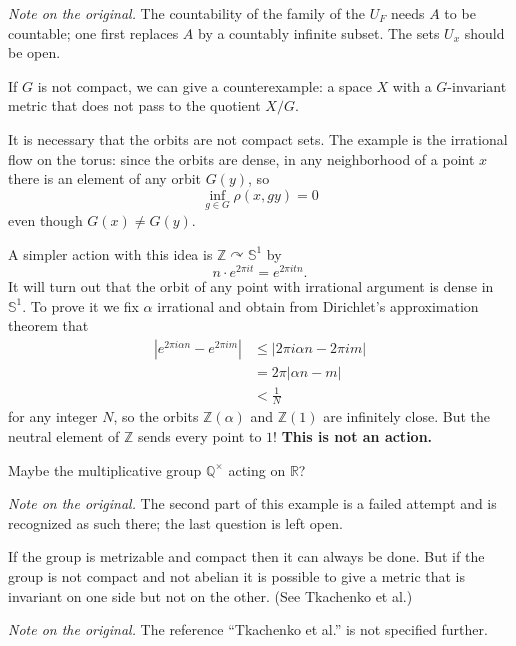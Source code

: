 \noindent
{\it Note on the original.} The
countability of the family of the $U_F$
needs $A$ to be countable; one first
replaces $A$ by a countably infinite
subset. The sets $U_x$ should be open.

\begin{example}
\label{example-noncompact-metric-fails}
If $G$ is not compact, we can give a
counterexample: a space $X$ with a
$G$-invariant metric that does not pass
to the quotient $X/G$.

It is necessary that the orbits are not
compact sets. The example is the
irrational flow on the torus: since the
orbits are dense, in any neighborhood
of a point $x$ there is an element of
any orbit $G(y)$, so
$$
\inf_{g\in G}\rho(x,gy)=0
$$
even though $G(x)\neq G(y)$.

A simpler action with this idea is
$\mathbb{Z}\curvearrowright
\mathbb{S}^1$ by
$$
n\cdot e^{2\pi it}=e^{2\pi itn}.
$$
It will turn out that the orbit of any
point with irrational argument is dense
in $\mathbb{S}^1$. To prove it we fix
$\alpha$ irrational and obtain from
Dirichlet's approximation theorem that
$$
\begin{aligned}
|e^{2\pi i\alpha n}-e^{2\pi im}|
&\leq|2\pi i\alpha n-2\pi im| \\
&=2\pi|\alpha n-m| \\
&<\frac{1}{N}
\end{aligned}
$$
for any integer $N$, so the orbits
$\mathbb{Z}(\alpha)$ and
$\mathbb{Z}(1)$ are infinitely close.
But the neutral element of $\mathbb{Z}$
sends every point to $1$! {\bf This is
not an action.}

Maybe the multiplicative group
$\mathbb{Q}^\times$ acting on
$\mathbb{R}$?
\end{example}

\noindent
{\it Note on the original.} The second
part of this example is a failed
attempt and is recognized as such
there; the last question is left open.

\begin{example}
\label{example-one-sided-invariant-metric}
If the group is metrizable and compact
then it can always be done. But if the
group is not compact and not abelian it
is possible to give a metric that is
invariant on one side but not on the
other. (See Tkachenko et al.)
\end{example}

\noindent
{\it Note on the original.} The
reference ``Tkachenko et al.'' is not
specified further.

